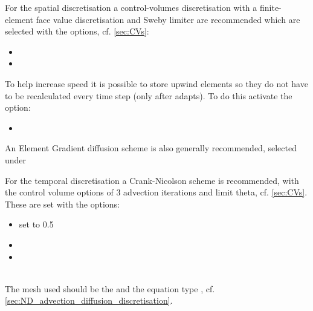 For the spatial discretisation a control-volumes discretisation with a finite-element face value discretisation and Sweby limiter are recommended which are selected with the options, cf. \ref{sec:CVs}:
\begin{itemize}
\item {}
\item {}
\end{itemize}
To help increase speed it is possible to store upwind elements so they do not have to be recalculated every time step (only after adapts). To do this activate the option:
\begin{itemize}
\item{}
\end{itemize}
An Element Gradient diffusion scheme is also generally recommended, selected under 

For the temporal discretisation a Crank-Nicolson scheme is recommended, with the control volume options of 3 advection iterations and limit theta, cf. \ref{sec:CVs}. These are set with the options:
\begin{itemize}
\item{ set to 0.5}
\item{}
\item{}
\end{itemize}

{\bf \PoDGPt} \\

The mesh used should be the  and the equation type , cf. \ref{sec:ND_advection_diffusion_discretisation}. 

